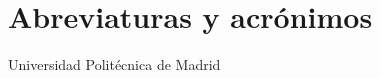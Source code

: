 %
\section*{Abreviaturas y acrónimos}
\label{sec::acronimos}

\vspace{10 mm}
\begin{description}[align=right,labelwidth=2cm] 
\item [UPM] Universidad Politécnica de Madrid





\end{description}

